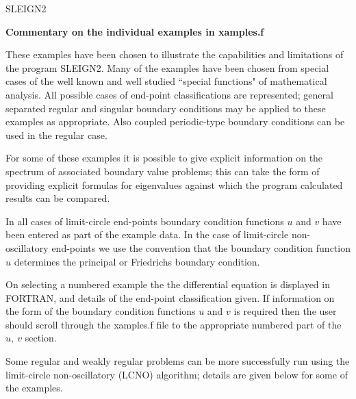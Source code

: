 \topmargin       0in
\textheight      8in 
\oddsidemargin   0in
\evensidemargin  0in
\textwidth       6.5in
\pagestyle{empty}
\newcommand{\Z}{\mbox{\msbm Z}}
\newcommand{\dfrac}{\displaystyle\frac}
\newcommand{\ul}{\underline}
\newenvironment{romlist}{\begin{list}{(\roman{romnum})}
    {\usecounter{romnum}\setlength{\topsep}{1pt}
    \setlength{\itemsep}{1pt}}
    \rm}{\end{list}}

\newcommand{\zettleq}{\raise.08in\hbox{.} 
\!\!\! =\!\!\!\raise-.03in\hbox{.} }


\baselineskip=24pt
\begin{center}
SLEIGN2
\end{center}
\vspace*{.2in}
\noindent
{\bf Commentary on the individual examples in xamples.f}

These examples have been chosen to illustrate the capabilities and
limitations of the program SLEIGN2.  Many of
the examples have been chosen from special cases of the well known and
well studied ``special functions" of mathematical analysis.  All
possible cases of end-point classifications are represented; general separated
regular and singular boundary conditions may be applied to these examples
as appropriate. Also coupled periodic-type boundary conditions can be 
used in the regular case.

For some of these examples it is possible to give explicit information
on the spectrum of associated boundary value problems; this can take the
form of providing explicit formulas for eigenvalues against which the
program calculated results can be compared.

In all cases of limit-circle end-points boundary condition functions $u$
and $v$ have been entered as part of the example data.  In the case of
limit-circle non-oscillatory end-points we use the convention that the
boundary condition function $u$ determines the principal or Friedrichs
boundary condition.

On selecting a numbered example the the differential
equation is displayed in FORTRAN, and details of the end-point
classification given.  If information on the form of the boundary condition
functions $u$ and $v$ is required then the user should scroll through
the xamples.f file to the appropriate  numbered part of the $u, \ v$
section.  

Some regular and weakly regular problems can be more successfully run using the 
limit-circle non-oscillatory (LCNO) algorithm; details are given below for some of
the examples.  

